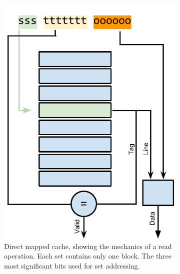 \begin{figure}
    \centering
    \begin{subfigure}[b]{0.48\textwidth}
        \includegraphics[width=\textwidth]{figures/introduction/dircache_read}
        \caption{Direct mapped cache, showing the mechanics of a read operation. Each set contains only one block. The three most significant bits used for set addressing.}
        \label{fig:introduction:cache:dir}
    \end{subfigure}%
    \begin{subfigure}[b]{0.48\textwidth}

\end{subfigure}
\end{figure}
